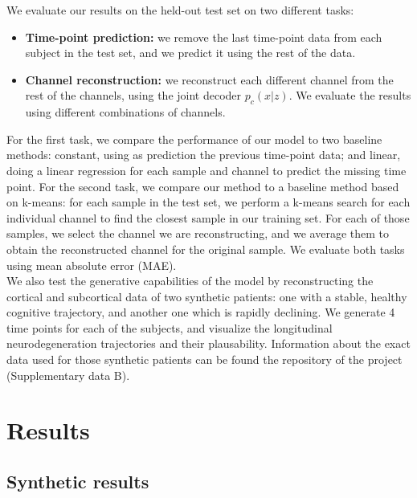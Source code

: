 We evaluate our results on the held-out test set on two different tasks: 

\begin{itemize}
    \item \textbf{Time-point prediction:} we remove the last time-point data from each subject in the test set, and we predict it using the rest of the data. 
    \item \textbf{Channel reconstruction:} we reconstruct each different channel from the rest of the channels, using the joint decoder $p_c(x|z)$. We evaluate the results using different combinations of channels.
\end{itemize}

For the first task, we compare the performance of our model to two baseline methods: constant, using as prediction the previous time-point data; and linear, doing a linear regression for each sample and channel to predict the missing time point. For the second task, we compare our method to a baseline method based on k-means: for each sample in the test set, we perform a k-means search for each individual channel to find the closest sample in our training set. For each of those samples, we select the channel we are reconstructing, and we average them to obtain the reconstructed channel for the original sample. We evaluate both tasks using mean absolute error (MAE). \\

We also test the generative capabilities of the model by reconstructing the cortical and subcortical data of two synthetic patients: one with a stable, healthy cognitive trajectory, and another one which is rapidly declining. We generate 4 time points for each of the subjects, and visualize the longitudinal neurodegeneration trajectories and their plausability. Information about the exact data used for those synthetic patients can be found the repository of the project (Supplementary data B). \\

\section{Results}
\label{rnn:results}

\subsection{Synthetic results}

